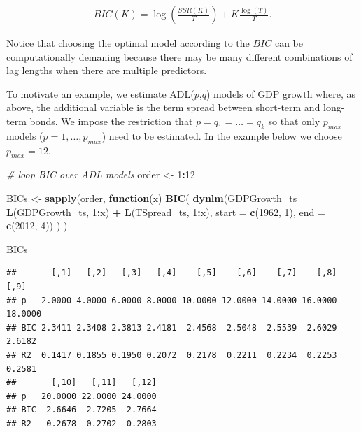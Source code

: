 \documentclass[]{book}
\newenvironment{Shaded}{\begin{snugshade}}{\end{snugshade}}
\newcommand{\KeywordTok}[1]{\textcolor[rgb]{0.13,0.29,0.53}{\textbf{#1}}}
\newcommand{\DataTypeTok}[1]{\textcolor[rgb]{0.13,0.29,0.53}{#1}}
\newcommand{\DecValTok}[1]{\textcolor[rgb]{0.00,0.00,0.81}{#1}}
\newcommand{\StringTok}[1]{\textcolor[rgb]{0.31,0.60,0.02}{#1}}
\newcommand{\CommentTok}[1]{\textcolor[rgb]{0.56,0.35,0.01}{\textit{#1}}}
\newcommand{\ControlFlowTok}[1]{\textcolor[rgb]{0.13,0.29,0.53}{\textbf{#1}}}
\newcommand{\OperatorTok}[1]{\textcolor[rgb]{0.81,0.36,0.00}{\textbf{#1}}}
\newcommand{\NormalTok}[1]{#1}
\theoremstyle{definition}
\theoremstyle{definition}
\theoremstyle{definition}
\theoremstyle{remark}
\begin{document}
\begin{align*}
    BIC(K) = \log\left(\frac{SSR(K)}{T}\right) + K \frac{\log(T)}{T}.
\end{align*}

Notice that choosing the optimal model according to the \(BIC\) can be
computationally demaning because there may be many different
combinations of lag lengths when there are multiple predictors.

To motivate an example, we estimate ADL(\(p\),\(q\)) models of GDP
growth where, as above, the additional variable is the term spread
between short-term and long-term bonds. We impose the restriction that
\(p=q_1=\dots=q_k\) so that only \(p_{max}\) models
(\(p=1,\dots,p_{max}\)) need to be estimated. In the example below we
choose \(p_{max} = 12\).

\begin{Shaded}
\begin{Highlighting}[]
\CommentTok{# loop BIC over ADL models }
\NormalTok{order <-}\StringTok{ }\DecValTok{1}\OperatorTok{:}\DecValTok{12}

\NormalTok{BICs <-}\StringTok{ }\KeywordTok{sapply}\NormalTok{(order, }
       \ControlFlowTok{function}\NormalTok{(x) }
         \KeywordTok{BIC}\NormalTok{(}
          \KeywordTok{dynlm}\NormalTok{(GDPGrowth_ts }\OperatorTok{~}\StringTok{ }\KeywordTok{L}\NormalTok{(GDPGrowth_ts, }\DecValTok{1}\OperatorTok{:}\NormalTok{x) }\OperatorTok{+}\StringTok{ }\KeywordTok{L}\NormalTok{(TSpread_ts, }\DecValTok{1}\OperatorTok{:}\NormalTok{x), }
          \DataTypeTok{start =} \KeywordTok{c}\NormalTok{(}\DecValTok{1962}\NormalTok{, }\DecValTok{1}\NormalTok{), }\DataTypeTok{end =} \KeywordTok{c}\NormalTok{(}\DecValTok{2012}\NormalTok{, }\DecValTok{4}\NormalTok{))}
\NormalTok{          )}
\NormalTok{       )}

\NormalTok{BICs}
\end{Highlighting}
\end{Shaded}

\begin{verbatim}
##       [,1]   [,2]   [,3]   [,4]    [,5]    [,6]    [,7]    [,8]    [,9]
## p   2.0000 4.0000 6.0000 8.0000 10.0000 12.0000 14.0000 16.0000 18.0000
## BIC 2.3411 2.3408 2.3813 2.4181  2.4568  2.5048  2.5539  2.6029  2.6182
## R2  0.1417 0.1855 0.1950 0.2072  0.2178  0.2211  0.2234  0.2253  0.2581
##       [,10]   [,11]   [,12]
## p   20.0000 22.0000 24.0000
## BIC  2.6646  2.7205  2.7664
## R2   0.2678  0.2702  0.2803
\end{verbatim}
\end{document}
